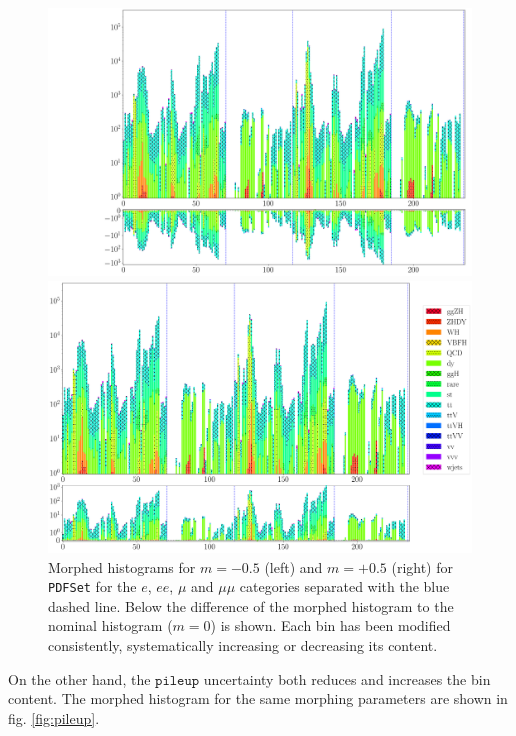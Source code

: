 \begin{figure}[h!]
	\centering
	\begin{minipage}{.5\textwidth}
		\centering
		\includegraphics[width=\linewidth]{figures/network_setup/PDFSet_-0.5}
	\end{minipage}%
	\begin{minipage}{.5\textwidth}
		\centering
		\includegraphics[width=\linewidth]{figures/network_setup/PDFSet_+0.5}
	\end{minipage}
	\caption{Morphed histograms for $m = -0.5$ (left) and $m = +0.5$ (right) for \texttt{PDFSet} for the $e$, $ee$, $\mu$ and $\mu\mu$ categories separated with the blue dashed line. Below the difference of the morphed histogram to the nominal histogram ($m = 0$) is shown. Each bin has been modified consistently, systematically increasing or decreasing its content.}
	\label{fig:pdfset}
\end{figure}

On the other hand, the $\texttt{pileup}$ uncertainty both reduces and increases the bin content. The morphed histogram for the same morphing parameters are shown in fig. \ref{fig:pileup}.

